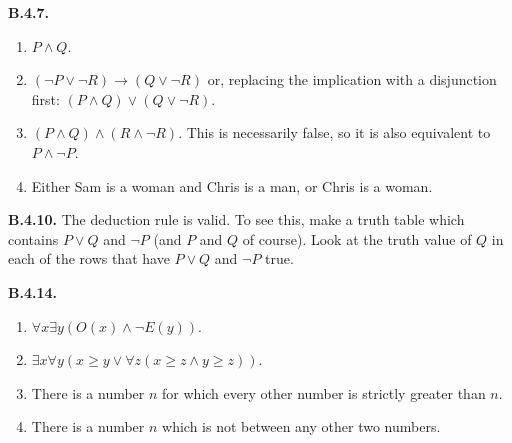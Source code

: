 \documentclass[10pt,]{book}
\theoremstyle{plain}
\theoremstyle{definition}
\theoremstyle{definition}
\theoremstyle{definition}
\theoremstyle{definition}
\numberwithin{equation}{chapter}
\def\imp{\rightarrow}
\begin{document}
\par\smallskip
\noindent\textbf{B.4.7.} \hypertarget{p-1986}{}%
\leavevmode%
\begin{enumerate}[label=(\alph*)]
\item\hypertarget{li-655}{}\(P \wedge Q\).%
\item\hypertarget{li-656}{}\((\neg P \vee \neg R) \imp (Q \vee \neg R)\) or, replacing the implication with a disjunction first: \((P \wedge Q) \vee (Q \vee \neg R)\).%
\item\hypertarget{li-657}{}\hypertarget{p-1987}{}%
\((P \wedge Q) \wedge (R \wedge \neg R)\). This is necessarily false, so it is also equivalent to \(P \wedge \neg P\).%
\item\hypertarget{li-658}{}\hypertarget{p-1988}{}%
Either Sam is a woman and Chris is a man, or Chris is a woman.%
\end{enumerate}
%
\par\smallskip
\noindent\textbf{B.4.10.} \hypertarget{p-1994}{}%
The deduction rule is valid. To see this, make a truth table which contains \(P \vee Q\) and \(\neg P\) (and \(P\) and \(Q\) of course). Look at the truth value of \(Q\) in each of the rows that have \(P \vee Q\) and \(\neg P\) true.%
\par\smallskip
\noindent\textbf{B.4.14.} \hypertarget{p-2006}{}%
\leavevmode%
\begin{enumerate}[label=(\alph*)]
\item\hypertarget{li-667}{}\(\forall x \exists y (O(x) \wedge \neg E(y))\).%
\item\hypertarget{li-668}{}\(\exists x \forall y (x \ge y \vee \forall z (x \ge z \wedge y \ge z))\).%
\item\hypertarget{li-669}{}\hypertarget{p-2007}{}%
There is a number \(n\) for which every other number is strictly greater than \(n\).%
\item\hypertarget{li-670}{}\hypertarget{p-2008}{}%
There is a number \(n\) which is not between any other two numbers.%
\end{enumerate}
%
\par\smallskip
\end{document}
